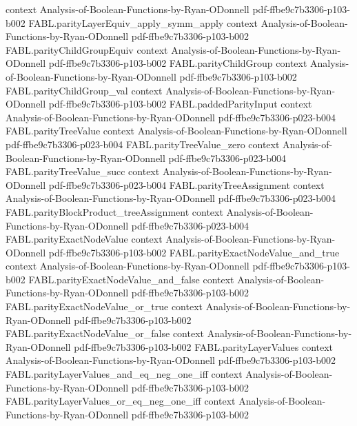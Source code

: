 \begin{theorem}
  {context}
  {Analysis-of-Boolean-Functions-by-Ryan-ODonnell}
  {pdf-ffbe9c7b3306-p103-b002}
\proofstep
  {FABL.parityLayerEquiv_apply_symm_apply}
  {context}
  {Analysis-of-Boolean-Functions-by-Ryan-ODonnell}
  {pdf-ffbe9c7b3306-p103-b002}
\proofstep
  {FABL.parityChildGroupEquiv}
  {context}
  {Analysis-of-Boolean-Functions-by-Ryan-ODonnell}
  {pdf-ffbe9c7b3306-p103-b002}
\proofstep
  {FABL.parityChildGroup}
  {context}
  {Analysis-of-Boolean-Functions-by-Ryan-ODonnell}
  {pdf-ffbe9c7b3306-p103-b002}
\proofstep
  {FABL.parityChildGroup_val}
  {context}
  {Analysis-of-Boolean-Functions-by-Ryan-ODonnell}
  {pdf-ffbe9c7b3306-p103-b002}
\proofstep
  {FABL.paddedParityInput}
  {context}
  {Analysis-of-Boolean-Functions-by-Ryan-ODonnell}
  {pdf-ffbe9c7b3306-p023-b004}
\proofstep
  {FABL.parityTreeValue}
  {context}
  {Analysis-of-Boolean-Functions-by-Ryan-ODonnell}
  {pdf-ffbe9c7b3306-p023-b004}
\proofstep
  {FABL.parityTreeValue_zero}
  {context}
  {Analysis-of-Boolean-Functions-by-Ryan-ODonnell}
  {pdf-ffbe9c7b3306-p023-b004}
\proofstep
  {FABL.parityTreeValue_succ}
  {context}
  {Analysis-of-Boolean-Functions-by-Ryan-ODonnell}
  {pdf-ffbe9c7b3306-p023-b004}
\proofstep
  {FABL.parityTreeAssignment}
  {context}
  {Analysis-of-Boolean-Functions-by-Ryan-ODonnell}
  {pdf-ffbe9c7b3306-p023-b004}
\proofstep
  {FABL.parityBlockProduct_treeAssignment}
  {context}
  {Analysis-of-Boolean-Functions-by-Ryan-ODonnell}
  {pdf-ffbe9c7b3306-p023-b004}
\proofstep
  {FABL.parityExactNodeValue}
  {context}
  {Analysis-of-Boolean-Functions-by-Ryan-ODonnell}
  {pdf-ffbe9c7b3306-p103-b002}
\proofstep
  {FABL.parityExactNodeValue_and_true}
  {context}
  {Analysis-of-Boolean-Functions-by-Ryan-ODonnell}
  {pdf-ffbe9c7b3306-p103-b002}
\proofstep
  {FABL.parityExactNodeValue_and_false}
  {context}
  {Analysis-of-Boolean-Functions-by-Ryan-ODonnell}
  {pdf-ffbe9c7b3306-p103-b002}
\proofstep
  {FABL.parityExactNodeValue_or_true}
  {context}
  {Analysis-of-Boolean-Functions-by-Ryan-ODonnell}
  {pdf-ffbe9c7b3306-p103-b002}
\proofstep
  {FABL.parityExactNodeValue_or_false}
  {context}
  {Analysis-of-Boolean-Functions-by-Ryan-ODonnell}
  {pdf-ffbe9c7b3306-p103-b002}
\proofstep
  {FABL.parityLayerValues}
  {context}
  {Analysis-of-Boolean-Functions-by-Ryan-ODonnell}
  {pdf-ffbe9c7b3306-p103-b002}
\proofstep
  {FABL.parityLayerValues_and_eq_neg_one_iff}
  {context}
  {Analysis-of-Boolean-Functions-by-Ryan-ODonnell}
  {pdf-ffbe9c7b3306-p103-b002}
\proofstep
  {FABL.parityLayerValues_or_eq_neg_one_iff}
  {context}
  {Analysis-of-Boolean-Functions-by-Ryan-ODonnell}
  {pdf-ffbe9c7b3306-p103-b002}

\end{theorem}
